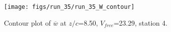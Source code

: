 \begin{figure}[H]
\centering
\texttt{[image: figs/run\_35/run\_35\_W\_contour]}
\caption{Contour plot of $\overline{w}$ at $z/c$=8.50, $V_{free}$=23.29, station 4.}
\label{fig:run_35_W_contour}
\end{figure}


